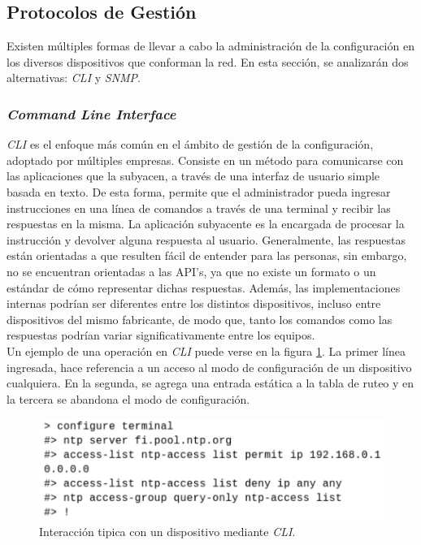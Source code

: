 \subsection{Protocolos de Gestión}
Existen múltiples formas de llevar a cabo la administración de la configuración en los diversos dispositivos que conforman la red. En esta sección, se analizarán dos alternativas: \textit{CLI} y \textit{SNMP}.

\subsubsection{\textit{Command Line Interface}}

\textit{CLI} es el enfoque más común en el ámbito de gestión de la configuración, adoptado por múltiples empresas. Consiste en un método para comunicarse con las aplicaciones que la subyacen, a través de una interfaz de usuario simple basada en texto. De esta forma, permite que el administrador pueda ingresar instrucciones en una línea de comandos a través de una terminal y recibir las respuestas en la misma. La aplicación subyacente es la encargada de procesar la instrucción y devolver alguna respuesta al usuario. Generalmente, las respuestas están orientadas a que resulten fácil de entender para las personas, sin embargo, no se encuentran orientadas a las API’s, ya que no existe un formato o un estándar de cómo representar dichas respuestas. Además, las implementaciones internas podrían ser diferentes entre los distintos dispositivos, incluso entre dispositivos del mismo fabricante, de modo que, tanto los comandos como las respuestas podrían variar significativamente entre los equipos.
\\

Un ejemplo de una operación en \textit{CLI} puede verse en la figura \ref{fig:cli}. La primer línea ingresada, hace referencia a un acceso al modo de configuración de un dispositivo cualquiera. En la segunda, se agrega una entrada estática a la tabla de ruteo y en la tercera se abandona el modo de configuración.
\\

\begin{figure}[htbp]
	\centering
	\includegraphics[scale=0.7]{Figures/cli.pdf}
	\caption{Interacción tipica con un dispositivo mediante \textit{CLI}.}
	\label{fig:cli}
  \end{figure}

